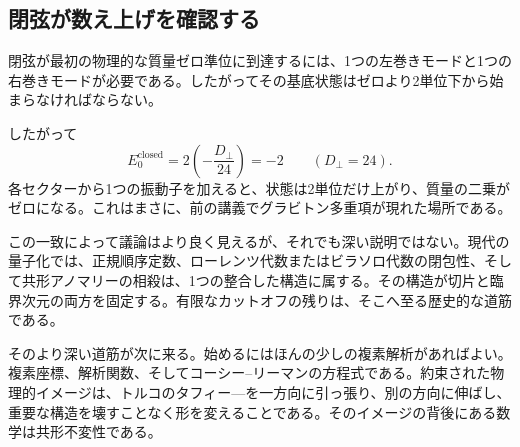 \subsection{閉弦が数え上げを確認する}

閉弦が最初の物理的な質量ゼロ準位に到達するには、1つの左巻きモードと1つの右巻きモードが必要である。したがってその基底状態はゼロより2単位下から始まらなければならない。

\begin{classroomqa}
\end{classroomqa}

したがって
\begin{equation}
  E_0^{\mathrm{closed}}
  =
  2\left(-\frac{D_\perp}{24}\right)
  =-2
  \qquad (D_\perp=24).
\end{equation}
各セクターから1つの振動子を加えると、状態は2単位だけ上がり、質量の二乗がゼロになる。これはまさに、前の講義でグラビトン多重項が現れた場所である。

この一致によって議論はより良く見えるが、それでも深い説明ではない。現代の量子化では、正規順序定数、ローレンツ代数またはビラソロ代数の閉包性、そして共形アノマリーの相殺は、1つの整合した構造に属する。その構造が切片と臨界次元の両方を固定する。有限なカットオフの残りは、そこへ至る歴史的な道筋である。

そのより深い道筋が次に来る。始めるにはほんの少しの複素解析があればよい。複素座標、解析関数、そしてコーシー--リーマンの方程式である。約束された物理的イメージは、トルコのタフィー---を一方向に引っ張り、別の方向に伸ばし、重要な構造を壊すことなく形を変えることである。そのイメージの背後にある数学は共形不変性である。

